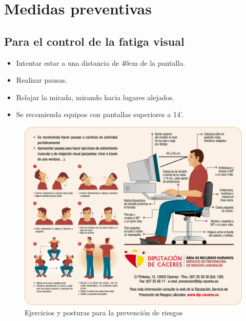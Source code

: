 \documentclass{article}
\begin{document}
  \newpage
    \section{Medidas preventivas}
      \subsection{Para el control de la fatiga visual}
        \begin{itemize}
          \item Intentar estar a una distancia de 40cm de la pantalla.
          \item Realizar pausas.
          \item Relajar la mirada, mirando hacia lugares alejados.
          \item Se recomienda equipos con pantallas superiores a 14'.
        \end{itemize}

        \begin{figure}[h]
          \centering
          \includegraphics[scale = 0.25]{img/prevencion1.jpg}
          \caption{Ejercicios y posturas para la prevención de riesgos}
        \end{figure}
\end{document}
